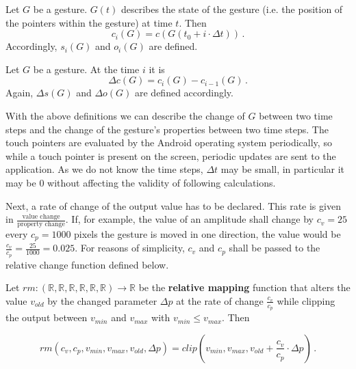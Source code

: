 \begin{defn}
Let $G$ be a gesture. $G(t)$ describes the state of the gesture (i.e. the position of the pointers within the gesture) at time $t$. Then
\begin{equation}
c_i(G) = c(G(t_0 + i \cdot \Delta t)) \, .
\end{equation}
Accordingly, $s_i(G)$ and $o_i(G)$ are defined.
\end{defn}

\begin{defn}
Let $G$ be a gesture. At the time $i$ it is
\begin{equation}
\Delta c(G) = c_i(G) - c_{i - 1}(G) \, .
\end{equation}
Again, $\Delta s(G)$ and $\Delta o(G)$ are defined accordingly.
\end{defn}

With the above definitions we can describe the change of $G$ between two time steps and the change of the gesture's properties between two time steps. The touch pointers are evaluated by the Android operating system periodically, so while a touch pointer is present on the screen, periodic updates are sent to the application. As we do not know the time steps, $\Delta t$ may be small, in particular it may be $0$ without affecting the validity of following calculations.

Next, a rate of change of the output value has to be declared. This rate is given in $\frac{\text{value change}}{\text{property change}}$. If, for example, the value of an amplitude shall change by $c_v = 25$ every $c_p = 1000$ pixels the gesture is moved in one direction, the value would be $\frac{c_v}{c_p} = \frac{25}{1000} = 0.025$. For reasons of simplicity, $c_v$ and $c_p$ shall be passed to the relative change function defined below.

\begin{defn}
	\label{def:conc:rm}
Let $rm : (\mathbb{R}, \mathbb{R}, \mathbb{R}, \mathbb{R}, \mathbb{R}, \mathbb{R}) \rightarrow \mathbb{R}$ be the \textbf{relative mapping} function that alters the value $v_{old}$ by the changed parameter $\Delta p$ at the rate of change $\frac{c_v}{c_p}$ while clipping the output between $v_{min}$ and $v_{max}$ with $v_{min} \leq v_{max}$. Then

\begin{equation}
rm(c_v, c_p, v_{min}, v_{max}, v_{old}, \Delta p) = clip(v_{min}, v_{max}, v_{old} + \frac{c_v}{c_p} \cdot \Delta p) \, .
\end{equation}
\end{defn}

